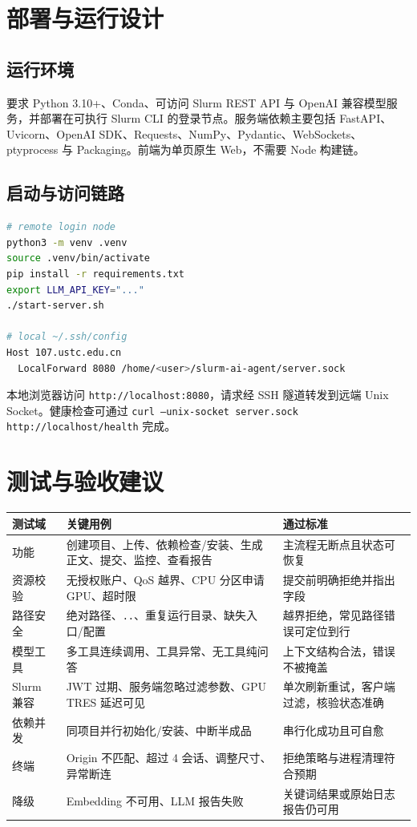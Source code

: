\documentclass[UTF8,11pt,a4paper]{ctexart}
\newcommand{\code}[1]{\texttt{\small #1}}
\begin{document}
\section{部署与运行设计}

\subsection{运行环境}
要求 Python 3.10+、Conda、可访问 Slurm REST API 与 OpenAI 兼容模型服务，并部署在可执行 Slurm CLI 的登录节点。服务端依赖主要包括 FastAPI、Uvicorn、OpenAI SDK、Requests、NumPy、Pydantic、WebSockets、ptyprocess 与 Packaging。前端为单页原生 Web，不需要 Node 构建链。

\subsection{启动与访问链路}
\begin{lstlisting}[language=bash]
# remote login node
python3 -m venv .venv
source .venv/bin/activate
pip install -r requirements.txt
export LLM_API_KEY="..."
./start-server.sh

# local ~/.ssh/config
Host 107.ustc.edu.cn
  LocalForward 8080 /home/<user>/slurm-ai-agent/server.sock
\end{lstlisting}
本地浏览器访问 \code{http://localhost:8080}，请求经 SSH 隧道转发到远端 Unix Socket。健康检查可通过 \code{curl --unix-socket server.sock http://localhost/health} 完成。

\section{测试与验收建议}

\begin{longtable}{>{\raggedright\arraybackslash}p{31mm}>{\raggedright\arraybackslash}p{68mm}>{\raggedright\arraybackslash}p{50mm}}
\toprule
\textbf{测试域} & \textbf{关键用例} & \textbf{通过标准}\\
\midrule
功能 & 创建项目、上传、依赖检查/安装、生成正文、提交、监控、查看报告 & 主流程无断点且状态可恢复\\
资源校验 & 无授权账户、QoS 越界、CPU 分区申请 GPU、超时限 & 提交前明确拒绝并指出字段\\
路径安全 & 绝对路径、\code{..}、重复运行目录、缺失入口/配置 & 越界拒绝，常见路径错误可定位到行\\
模型工具 & 多工具连续调用、工具异常、无工具纯问答 & 上下文结构合法，错误不被掩盖\\
Slurm 兼容 & JWT 过期、服务端忽略过滤参数、GPU TRES 延迟可见 & 单次刷新重试，客户端过滤，核验状态准确\\
依赖并发 & 同项目并行初始化/安装、中断半成品 & 串行化成功且可自愈\\
终端 & Origin 不匹配、超过 4 会话、调整尺寸、异常断连 & 拒绝策略与进程清理符合预期\\
降级 & Embedding 不可用、LLM 报告失败 & 关键词结果或原始日志报告仍可用\\
\bottomrule
\end{longtable}
\end{document}
